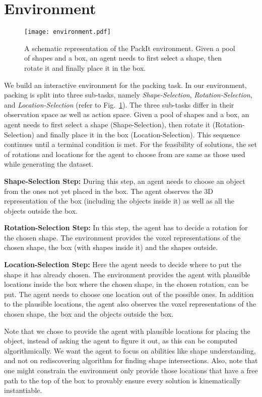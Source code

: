\documentclass{article}
\begin{document}
\section{Environment}
\label{sec:environment}
\begin{figure}
  \centering
  \texttt{[image: environment.pdf]}
  \caption{A schematic representation of the PackIt environment. Given a pool of shapes and a box, an agent needs to first select a shape, then rotate it and finally place it in the box.}
  \centering
  \label{fig:env}
\end{figure}
We build an interactive environment for the packing task. In our environment, packing is split into three sub-tasks, namely \textit{Shape-Selection}, \textit{Rotation-Selection}, and \textit{Location-Selection} (refer to Fig.~\ref{fig:env}). The three sub-tasks differ in their observation space as well as action space. Given a pool of shapes and a box, an agent needs to first select a shape (Shape-Selection), then rotate it (Rotation-Selection) and finally place it in the box (Location-Selection). This sequence continues until a terminal condition is met. For the feasibility of solutions, the set of rotations and locations for the agent to choose from are same as those used while generating the dataset.

\noindent \textbf{Shape-Selection Step:} During this step, an agent needs to choose an object from the ones not yet placed in the box. The agent observes the 3D representation of the box (including the objects inside it) as well as all the objects outside the box.  

\noindent \textbf{Rotation-Selection Step:} In this step, the agent has to decide a rotation for the chosen shape. The environment provides the voxel representations of the chosen shape, the box (with shapes inside it) and the shapes outside.

\noindent\textbf{Location-Selection Step:} Here the agent needs to decide where to put the shape it has already chosen. The environment provides the agent with plausible locations inside the box where the chosen shape, in the chosen rotation, can be put. The agent needs to choose one location out of the possible ones. In addition to the plausible locations, the agent also observes the voxel representations of the chosen shape, the box and the objects outside the box. 

Note that we chose to provide the agent with plausible locations for placing the object, instead of asking the agent to figure it out, as this can be computed algorithmically. We want the agent to focus on abilities like shape understanding, and not on rediscovering algorithm for finding shape intersections. Also, note that one might constrain the environment only provide those locations that have a free path to the top of the box to provably ensure every solution is kinematically instantiable.
\end{document}
